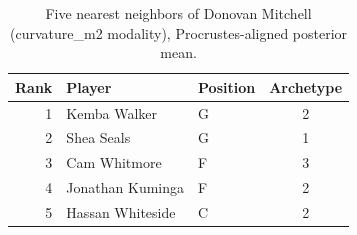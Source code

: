 \begin{table}[htbp]
  \centering\small
  \begin{tabular}{rllc}
    \toprule
    Rank & Player & Position & Archetype \\
    \midrule
    1 & Kemba Walker & G & 2 \\
    2 & Shea Seals & G & 1 \\
    3 & Cam Whitmore & F & 3 \\
    4 & Jonathan Kuminga & F & 2 \\
    5 & Hassan Whiteside & C & 2 \\
    \bottomrule
  \end{tabular}
  \caption{Five nearest neighbors of Donovan Mitchell (curvature_m2 modality), Procrustes-aligned posterior mean.}
  \label{tab:Donovan_Mitchell_neighbors_curvature_m2}
\end{table}


